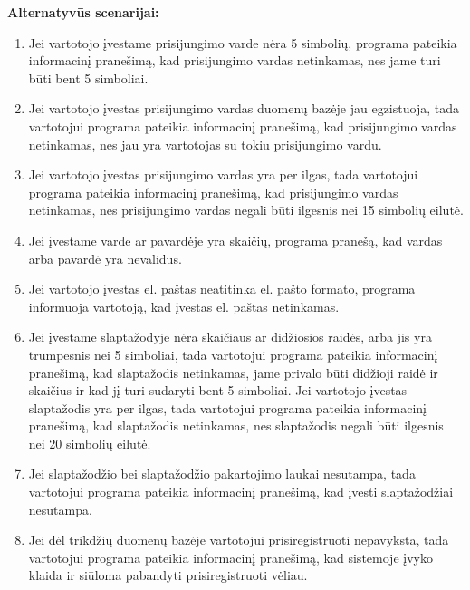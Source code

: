 \documentclass{VUMIFPSkursinis}
\begin{document}
	\textbf{Alternatyvūs scenarijai:}
	\begin{enumerate}[itemsep=-2mm]
		\item Jei vartotojo įvestame prisijungimo varde nėra 5 simbolių, programa pateikia informacinį pranešimą, kad prisijungimo vardas netinkamas, nes jame turi būti bent 5 simboliai.
		\item Jei vartotojo įvestas prisijungimo vardas duomenų bazėje jau egzistuoja, tada vartotojui programa pateikia informacinį pranešimą, kad prisijungimo vardas netinkamas, nes jau yra vartotojas su tokiu prisijungimo vardu.
		\item Jei vartotojo įvestas prisijungimo vardas yra per ilgas, tada vartotojui programa pateikia informacinį pranešimą, kad prisijungimo vardas netinkamas, nes prisijungimo vardas negali būti ilgesnis nei 15 simbolių eilutė.
		\item Jei įvestame varde ar pavardėje yra skaičių, programa pranešą, kad vardas arba pavardė yra nevalidūs.
		\item Jei vartotojo įvestas el. paštas neatitinka el. pašto formato, programa informuoja vartotoją, kad įvestas el. paštas netinkamas.
		\item Jei įvestame slaptažodyje nėra skaičiaus ar didžiosios raidės, arba jis yra trumpesnis nei 5 simboliai, tada vartotojui programa pateikia informacinį pranešimą, kad slaptažodis netinkamas, jame privalo būti didžioji raidė ir skaičius ir kad jį turi sudaryti bent 5 simboliai. Jei  vartotojo įvestas slaptažodis yra per ilgas, tada vartotojui programa pateikia informacinį pranešimą, kad slaptažodis netinkamas, nes slaptažodis negali būti ilgesnis nei 20 simbolių eilutė.
		\item Jei slaptažodžio bei slaptažodžio pakartojimo laukai nesutampa, tada vartotojui programa pateikia informacinį pranešimą, kad įvesti slaptažodžiai nesutampa.
		\item Jei dėl trikdžių duomenų bazėje vartotojui prisiregistruoti nepavyksta, tada vartotojui programa pateikia informacinį pranešimą, kad sistemoje įvyko klaida ir siūloma pabandyti prisiregistruoti vėliau.
	\end{enumerate} 
\end{document}
